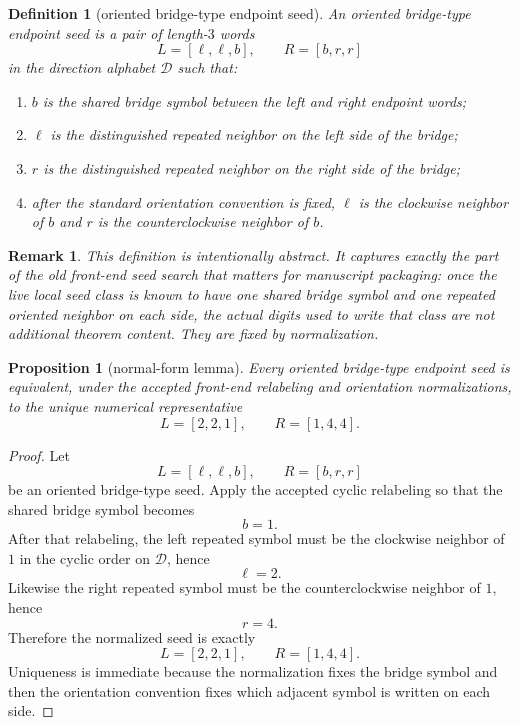 \documentclass[11pt]{article}
\newtheorem{proposition}[theorem]{Proposition}
\newtheorem{remark}[theorem]{Remark}
\newtheorem{definition}[theorem]{Definition}
\begin{document}
\begin{definition}[oriented bridge-type endpoint seed]
An \emph{oriented bridge-type endpoint seed} is a pair of length-$3$ words
\[
L=[\ell,\ell,b],\qquad R=[b,r,r]
\]
in the direction alphabet $\mathcal D$ such that:
\begin{enumerate}[label=\textup{(\roman*)},leftmargin=2.5em]
\item $b$ is the shared bridge symbol between the left and right endpoint
      words;
\item $\ell$ is the distinguished repeated neighbor on the left side of the
      bridge;
\item $r$ is the distinguished repeated neighbor on the right side of the
      bridge;
\item after the standard orientation convention is fixed, $\ell$ is the
      clockwise neighbor of $b$ and $r$ is the counterclockwise neighbor of
      $b$.
\end{enumerate}
\end{definition}

\begin{remark}
This definition is intentionally abstract.
It captures exactly the part of the old front-end seed search that matters for
manuscript packaging: once the live local seed class is known to have one
shared bridge symbol and one repeated oriented neighbor on each side, the
actual digits used to write that class are not additional theorem content.
They are fixed by normalization.
\end{remark}

\begin{proposition}[normal-form lemma]
\label{prop:seed-normal-form}
Every oriented bridge-type endpoint seed is equivalent, under the accepted
front-end relabeling and orientation normalizations, to the unique numerical
representative
\[
L=[2,2,1],\qquad R=[1,4,4].
\]
\end{proposition}

\begin{proof}
Let
\[
L=[\ell,\ell,b],\qquad R=[b,r,r]
\]
be an oriented bridge-type seed.
Apply the accepted cyclic relabeling so that the shared bridge symbol becomes
\[
b=1.
\]
After that relabeling, the left repeated symbol must be the clockwise neighbor
of $1$ in the cyclic order on $\mathcal D$, hence
\[
\ell=2.
\]
Likewise the right repeated symbol must be the counterclockwise neighbor of $1$,
hence
\[
r=4.
\]
Therefore the normalized seed is exactly
\[
L=[2,2,1],\qquad R=[1,4,4].
\]
Uniqueness is immediate because the normalization fixes the bridge symbol and
then the orientation convention fixes which adjacent symbol is written on each
side.
\end{proof}
\end{document}
